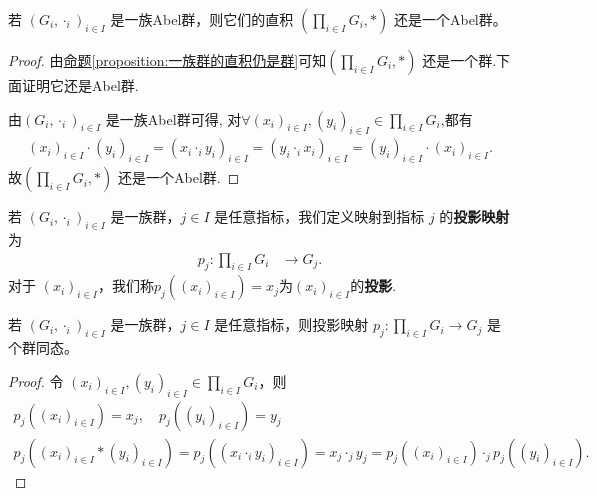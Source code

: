 \documentclass[../../main.tex]{subfiles}
\begin{document}
\begin{proposition}[一族Abel群的直积仍是Abel群]\label{proposition:一族Abel群的直积仍是Abel群}
若 $(G_i,\cdot_i)_{i\in I}$ 是一族Abel群，则它们的直积 $(\prod_{i\in I}G_i,*)$ 还是一个Abel群。  
\end{proposition}
\begin{proof}
由\hyperref[proposition:一族群的直积仍是群]{命题\ref{proposition:一族群的直积仍是群}}可知$(\prod_{i\in I}G_i,*)$ 还是一个群.下面证明它还是Abel群.

由$(G_i,\cdot_i)_{i\in I}$ 是一族Abel群可得,
对$\forall (x_i)_{i\in I},(y_i)_{i\in I} \in \prod_{i\in I}G_i$,都有
\begin{align*}
\left( x_i \right) _{i\in I}\cdot \left( y_i \right) _{i\in I}=\left( x_i\cdot _iy_i \right) _{i\in I}=\left( y_i\cdot _ix_i \right) _{i\in I}=\left( y_i \right) _{i\in I}\cdot \left( x_i \right) _{i\in I}.
\end{align*}
故$(\prod_{i\in I}G_i,*)$ 还是一个Abel群.

\end{proof}

\begin{definition}[投影映射]
若 $(G_i,\cdot_i)_{i\in I}$ 是一族群，$j\in I$ 是任意指标，我们定义映射到指标 $j$ 的\textbf{投影映射}为
\begin{align*}
p_j:\prod_{i\in I}G_i&\to G_j.
\end{align*}
对于 $(x_i)_{i\in I}$，我们称$p_j((x_i)_{i\in I})=x_j$为$(x_i)_{i\in I}$的\textbf{投影}.
\end{definition}

\begin{proposition}[投影映射是群同态]\label{proposition:投影映射是群同态}
若 $(G_i,\cdot_i)_{i\in I}$ 是一族群，$j\in I$ 是任意指标，则投影映射 $p_j:\prod_{i\in I}G_i\to G_j$ 是个群同态。
\end{proposition}
\begin{proof}
令 $(x_i)_{i\in I},(y_i)_{i\in I}\in\prod_{i\in I}G_i$，则
\begin{gather*}
p_j((x_i)_{i\in I})=x_j,\quad p_j((y_i)_{i\in I})=y_j\\
p_j((x_i)_{i\in I}*(y_i)_{i\in I})=p_j((x_i\cdot_i y_i)_{i\in I})=x_j\cdot_j y_j = p_j((x_i)_{i\in I})\cdot_j p_j((y_i)_{i\in I}).
\end{gather*}

\end{proof}
\end{document}
